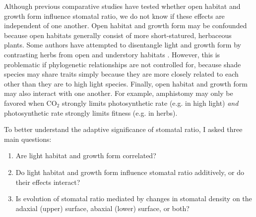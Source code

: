\documentclass[12pt, oneside]{article}
\begin{document}
Although previous comparative studies have tested whether open habitat and growth form influence stomatal ratio, we do not know if these effects are independent of one another. Open habitat and growth form may be confounded because open habitats generally consist of more short-statured, herbaceous plants. Some authors have attempted to disentangle light and growth form by contrasting herbs from open and understory habitats \citep{Salisbury_1927}. However, this is problematic if phylogenetic relationships are not controlled for, because shade species may share traits simply because they are more closely related to each other than they are to high light species. Finally, open habitat and growth form may also interact with one another. For example, amphistomy may only be favored when CO$_2$ strongly limits photosynthetic rate (e.g. in high light) \textit{and} photosynthetic rate strongly limits fitness (e.g. in herbs).

To better understand the adaptive significance of stomatal ratio, I asked three main questions:

\begin{enumerate}

  \item{Are light habitat and growth form correlated?}
  \item{Do light habitat and growth form influence stomatal ratio additively, or do their effects interact?}
  \item{Is evolution of stomatal ratio mediated by changes in stomatal density on the adaxial (upper) surface, abaxial (lower) surface, or both?}
  
\end{enumerate}
\end{document}
